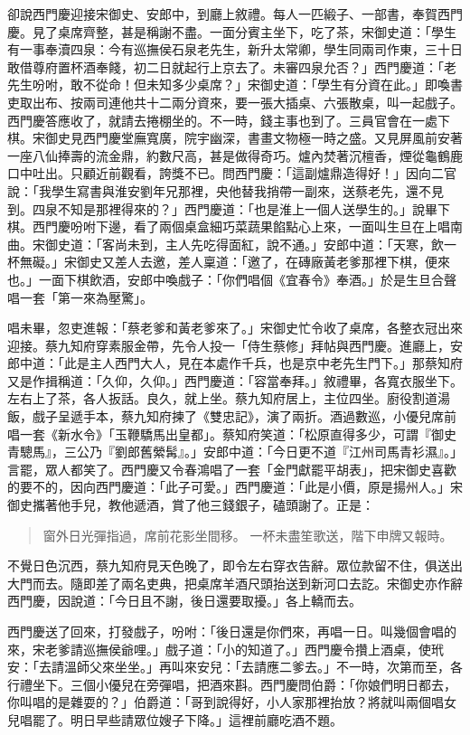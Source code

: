 卻說西門慶迎接宋御史、安郎中，到廳上敘禮。每人一匹緞子、一部書，奉賀西門慶。見了桌席齊整，甚是稱謝不盡。一面分賓主坐下，吃了茶，宋御史道：「學生有一事奉瀆四泉：今有巡撫侯石泉老先生，新升太常卿，學生同兩司作東，三十日敢借尊府置杯酒奉餞，初二日就起行上京去了。未審四泉允否？」西門慶道：「老先生吩咐，敢不從命！但未知多少桌席？」宋御史道：「學生有分資在此。」即喚書吏取出布、按兩司連他共十二兩分資來，要一張大插桌、六張散桌，叫一起戲子。西門慶答應收了，就請去捲棚坐的。不一時，錢主事也到了。三員官會在一處下棋。宋御史見西門慶堂廡寬廣，院宇幽深，書畫文物極一時之盛。又見屏風前安著一座八仙捧壽的流金鼎，約數尺高，甚是做得奇巧。爐內焚著沉檀香，煙從龜鶴鹿口中吐出。只顧近前觀看，誇獎不已。問西門慶：「這副爐鼎造得好！」因向二官說：「我學生寫書與淮安劉年兄那裡，央他替我捎帶一副來，送蔡老先，還不見到。四泉不知是那裡得來的？」西門慶道：「也是淮上一個人送學生的。」說畢下棋。西門慶吩咐下邊，看了兩個桌盒細巧菜蔬果餡點心上來，一面叫生旦在上唱南曲。宋御史道：「客尚未到，主人先吃得面紅，說不通。」安郎中道：「天寒，飲一杯無礙。」宋御史又差人去邀，差人稟道：「邀了，在磚廠黃老爹那裡下棋，便來也。」一面下棋飲酒，安郎中喚戲子：「你們唱個《宜春令》奉酒。」於是生旦合聲唱一套「第一來為壓驚」。

唱未畢，忽吏進報：「蔡老爹和黃老爹來了。」宋御史忙令收了桌席，各整衣冠出來迎接。蔡九知府穿素服金帶，先令人投一「侍生蔡修」拜帖與西門慶。進廳上，安郎中道：「此是主人西門大人，見在本處作千兵，也是京中老先生門下。」那蔡知府又是作揖稱道：「久仰，久仰。」西門慶道：「容當奉拜。」敘禮畢，各寬衣服坐下。左右上了茶，各人扳話。良久，就上坐。蔡九知府居上，主位四坐。廚役割道湯飯，戲子呈遞手本，蔡九知府揀了《雙忠記》，演了兩折。酒過數巡，小優兒席前唱一套《新水令》「玉鞭驕馬出皇都」。蔡知府笑道：「松原直得多少，可謂『御史青驄馬』，三公乃『劉郎舊縈髯』。」安郎中道：「今日更不道『江州司馬青衫濕』。」言罷，眾人都笑了。西門慶又令春鴻唱了一套「金門獻罷平胡表」，把宋御史喜歡的要不的，因向西門慶道：「此子可愛。」西門慶道：「此是小價，原是揚州人。」宋御史攜著他手兒，教他遞酒，賞了他三錢銀子，磕頭謝了。正是：
\begin{quote}
窗外日光彈指過，席前花影坐間移。
一杯未盡笙歌送，階下申牌又報時。
\end{quote}

不覺日色沉西，蔡九知府見天色晚了，即令左右穿衣告辭。眾位款留不住，俱送出大門而去。隨即差了兩名吏典，把桌席羊酒尺頭抬送到新河口去訖。宋御史亦作辭西門慶，因說道：「今日且不謝，後日還要取擾。」各上轎而去。

西門慶送了回來，打發戲子，吩咐：「後日還是你們來，再唱一日。叫幾個會唱的來，宋老爹請巡撫侯爺哩。」戲子道：「小的知道了。」西門慶令攢上酒桌，使玳安：「去請溫師父來坐坐。」再叫來安兒：「去請應二爹去。」不一時，次第而至，各行禮坐下。三個小優兒在旁彈唱，把酒來斟。西門慶問伯爵：「你娘們明日都去，你叫唱的是雜耍的？」伯爵道：「哥到說得好，小人家那裡抬放？將就叫兩個唱女兒唱罷了。明日早些請眾位嫂子下降。」這裡前廳吃酒不題。

